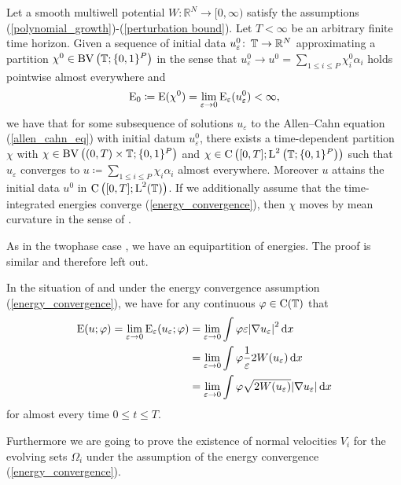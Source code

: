\begin{theorem}
	\label{convergence_to_multiphase_mcf}
	Let a smooth multiwell potential $ W \colon \mathbb{ R }^{ N } \to [ 0, 
	\infty ) $ satisfy the assumptions 
	(\ref{polynomial_growth})-(\ref{perturbation bound}). Let $ T < \infty 
	$ be an arbitrary finite time horizon. Given a sequence of initial data 
	$ u_{ \varepsilon }^{ 0 } \colon \operatorname{\mathbb{T}} \to \mathbb{ R }^{ N } $ 
	approximating a partition 
	$ \chi^{ 0 } \in \operatorname{BV} \left( \operatorname{\mathbb{T}} ; \{ 0 , 1 \}^{ P } \right) $ 
	in the sense that 
	$ u_{ \varepsilon }^{ 0 } \to u^{ 0 } =  \sum_{ 1 \leq i \leq P } 
	\chi_{ i }^{ 0 } \alpha_{ i } $ 
	holds pointwise almost everywhere and 
	\begin{equation*} 
		\operatorname{E}_{ 0 } 
		\coloneqq 
		\operatorname{E} ( \chi^{ 0 } ) 
		= 
		\lim_{ \varepsilon \to 0 } 
		\operatorname{E}_{ \varepsilon } ( u_{ \varepsilon }^{ 0 } ) 
		< 
		\infty,
	\end{equation*}
	we have that for 
	some subsequence of solutions $ u_{\varepsilon } $ to the Allen--Cahn 
	equation
	(\ref{allen_cahn_eq}) with initial datum $ u_{ 
		\varepsilon }^{ 0 } $, there exists a time-dependent partition $ \chi $ 
	with 
	$ \chi \in \operatorname{BV} \left( ( 0 , T ) \times \operatorname{\mathbb{T}} ; \{ 0 , 1 \}^{ P } 
	\right) $ and
	$ \chi 
	\in \operatorname{C} \left( [ 0 , T ] ; \operatorname{L}^{ 2 } \left( \operatorname{\mathbb{T}} ;  \{ 0 , 1 
	\}^{ P } \right) \right) $ such that $ u_{ \varepsilon } $ converges to 
	$ u \coloneqq \sum_{ 1 \leq i \leq P } \chi_{ i } \alpha_{ i } $ almost 
	everywhere. Moreover $ u $ attains the initial data $ u^{ 0 } $ in $ 
	\operatorname{C} \left( [ 0, T ] ; \operatorname{L}^{ 2 }( \operatorname{\mathbb{T}} ) \right) $. If we 
	additionally assume that the 
	time-integrated energies converge (\ref{energy_convergence}), then $ 
	\chi $ moves by mean curvature in the sense of .
\end{theorem} 
As in the twophase case , we have an 
equipartition of energies. The proof is similar and therefore left out.

\begin{lemma}
	\label{equipartition_of_energies_multiphase}
	In the situation of  and under 
	the energy convergence assumption (\ref{energy_convergence}), we have for 
	any continuous $ \varphi \in \operatorname{C} ( \operatorname{\mathbb{T}} ) $ that
	\begin{align*}
		\operatorname{E} ( u ; \varphi )
		=
		\lim_{ \varepsilon \to 0 }
		\operatorname{E}_{ \varepsilon } ( u_{ \varepsilon } ; \varphi )
		& =
		\lim_{ \varepsilon \to 0 }
		\int
		\varphi
		\varepsilon
		\abs{ \nabla u_{ \varepsilon } }^{ 2 }
		\dd{ x }
		\\
		& =
		\lim_{ \varepsilon \to 0 }
		\int
		\varphi
		\frac{ 1 }{ \varepsilon } 2 W ( u_{ \varepsilon } )
		\dd{ x }
		\\
		& =
		\lim_{ \varepsilon \to 0 }
		\int
		\varphi
		\sqrt{ 2 W ( u_{ \varepsilon } ) }
		\abs{ \nabla u_{ \varepsilon } }
		\dd{ x }
	\end{align*}
	for almost every time $ 0 \leq t \leq T $.
\end{lemma}
Furthermore we are going to prove the existence of normal velocities $ V_{ 
i } $ for the evolving sets $ \Omega_{ i } $ under the assumption of the energy 
convergence
(\ref{energy_convergence}).


